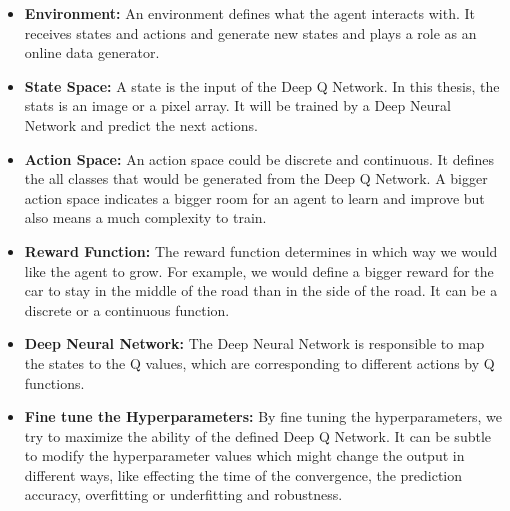 \begin{itemize}
	
    \item \textbf{Environment:} An environment defines what the agent interacts with. It receives states and actions and generate new states and plays a role as an online data generator. 
    \item \textbf{State Space:} A state is the input of the Deep Q Network. In this thesis, the stats is an image or a pixel array. It will be trained by a Deep Neural Network and predict the next actions.
    \item \textbf{Action Space:} An action space could be discrete and continuous. It defines the all classes that would be generated from the Deep Q Network. A bigger action space indicates a bigger room for an agent to learn and improve but also means a much complexity to train.
    \item \textbf{Reward Function:} The reward function determines in which way we would like the agent to grow. For example, we would define a bigger reward for the car to stay in the middle of the road than in the side of the road. It can be a discrete or a continuous function.
    \item \textbf{Deep Neural Network:} The Deep Neural Network is responsible to map the states to the Q values, which are corresponding to different actions by Q functions. 
    \item \textbf{Fine tune the Hyperparameters:} By fine tuning the hyperparameters, we try to maximize the ability of the defined Deep Q Network. It can be subtle to modify the hyperparameter values which might change the output in different ways, like effecting the time of the convergence, the prediction accuracy, overfitting or underfitting and robustness.
    
\end{itemize}






